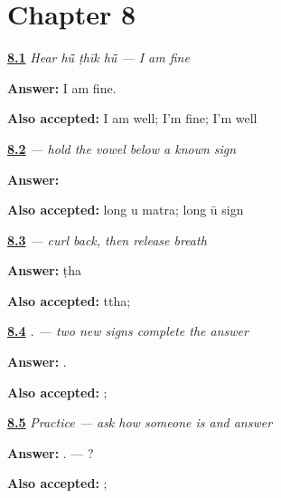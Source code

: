 \section*{Chapter 8}

\noindent\begin{minipage}[t]{\linewidth}
\raggedright
\hyperlink{review-MW-C06-hear-answer-meaning}{\textbf{8.1}} \emph{Hear \emph{hū̃ ṭhīk hū̃} — I am fine}\par
\small \textbf{Answer:} I am fine.\par
\footnotesize \textbf{Also accepted:} I am well; I'm fine; I'm well
\end{minipage}\par\medskip

\noindent\begin{minipage}[t]{\linewidth}
\raggedright
\hyperlink{review-MW-W06-uu-matra-build}{\textbf{8.2}} \emph{ — hold the vowel below a known sign}\par
\small \textbf{Answer:} \par
\footnotesize \textbf{Also accepted:} long u matra; long ū sign
\end{minipage}\par\medskip

\noindent\begin{minipage}[t]{\linewidth}
\raggedright
\hyperlink{review-MW-W06-ttha-read}{\textbf{8.3}} \emph{ — curl back, then release breath}\par
\small \textbf{Answer:} ṭha\par
\footnotesize \textbf{Also accepted:} ttha; 
\end{minipage}\par\medskip

\noindent\begin{minipage}[t]{\linewidth}
\raggedright
\hyperlink{review-MW-C06-answer-write}{\textbf{8.4}} \emph{  . — two new signs complete the answer}\par
\small \textbf{Answer:}   .\par
\footnotesize \textbf{Also accepted:}   ;   
\end{minipage}\par\medskip

\noindent\begin{minipage}[t]{\linewidth}
\raggedright
\hyperlink{review-MW-C06-practice-wellbeing}{\textbf{8.5}} \emph{Practice — ask how someone is and answer}\par
\small \textbf{Answer:}   . —   ?\par
\footnotesize \textbf{Also accepted:}   ;   
\end{minipage}\par\medskip

